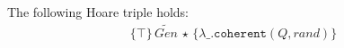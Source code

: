 
\begin{lemma}\label{lemma:gen-coherence}
The following Hoare triple holds:
\begin{align*}
\{\top\}\,\widetilde{Gen}\, \star\,\{\lambda \_.\mathtt{coherent}(Q, rand)\}
\end{align*}
\end{lemma}

